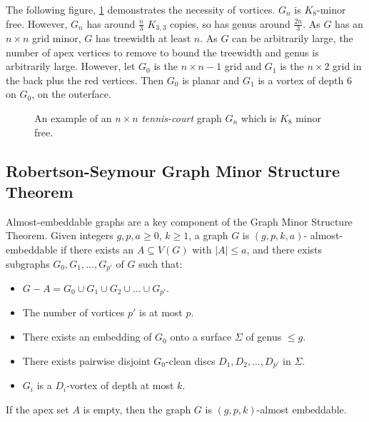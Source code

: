 The following figure, \cref{fig:tenniscourt} demonstrates the necessity of vortices. $G_n$ is $K_8$-minor free. However, $G_n$ has around $\frac{n}{3}$ $K_{3,3}$ copies, so has genus around $\frac{2n}{3}$. As $G$ has an $n \times n$ grid minor, $G$ has treewidth at least $n$. As $G$ can be arbitrarily large, the number of apex vertices to remove to bound the treewidth and genus is arbitrarily large. However, let $G_0$ is the $n \times n - 1$ grid and $G_1$ is the $n \times 2$ grid in the back plus the red vertices. Then $G_0$ is planar and $G_1$ is a vortex of depth 6 on $G_0$, on the outerface. 

\begin{figure}[h]
	\centering
	
	\caption[Tennis-Court graph]{An example of an $n \times n$ \textit{tennis-court} graph $G_n$ which is \(K_8\) minor free.}\label{fig:tenniscourt}
\end{figure}
\subsection{Robertson-Seymour Graph Minor Structure Theorem}\label{ssec:Robertson_Seymour_Graph_Structure}
Almost-embeddable graphs are a key component of the Graph Minor Structure Theorem. Given integers \(g, p, a \geq 0\), \(k \geq 1\), a graph \(G\) is \((g, p, k, a)\)- almost-embeddable if there exists an \(A \subseteq V(G)\) with \(|A| \leq a\), and there exists subgraphs \(G_0, G_1, \ldots,  G_{p'}\) of \(G\) such that:
\begin{itemize}
	\item \(G - A = G_0 \cup G_1 \cup G_2 \cup \ldots \cup G_{p'}\).
	\item The number of vortices $p'$ is at most $p$.
	\item There exists an embedding of \(G_0\) onto a surface \(\Sigma\) of genus \(\leq g\).
	\item There exists pairwise disjoint \(G_0\)-clean discs \(D_1, D_2, \ldots, D_{p'}\) in \(\Sigma\).
	\item \(G_i\) is a \(D_i\)-vortex of depth at most \(k\).
\end{itemize}

 If the apex set $A$ is empty, then the graph $G$ is $(g, p, k)$-almost embeddable. 

